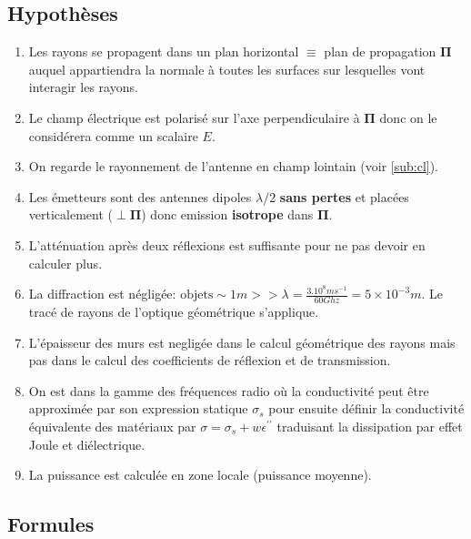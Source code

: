 \documentclass[sn-mathphys-num]{sn-jnl}
\begin{document}
    \subsection{Hypothèses}
    \begin{enumerate}
        \item Les rayons se propagent dans un plan horizontal $\equiv$ plan de propagation $\mathbf{\Pi}$ 
        auquel appartiendra la normale à toutes les surfaces sur lesquelles vont interagir les rayons.
        \item Le champ électrique est polarisé sur l'axe perpendiculaire à $\mathbf{\Pi}$
        donc on le considérera comme un scalaire $E$.
        \item On regarde le rayonnement de l'antenne en champ lointain (voir \ref{sub:cl}).
        \item \label{dipole} Les émetteurs sont des antennes dipoles $\lambda/2$ \textbf{sans pertes}
        et placées verticalement ($\perp \mathbf{\Pi}$) donc emission \textbf{isotrope} dans $\mathbf{\Pi}$.
        \item L'atténuation après deux réflexions est suffisante pour ne pas devoir en calculer plus.
        \item La diffraction est négligée: $\text{objets} \sim 1m >> \lambda = \frac{3.10^8ms^{-1}}{60Ghz} = 5 \times 10^{-3}m$. 
        Le tracé de rayons de l'optique géométrique s'applique.
        \item L'épaisseur des murs est negligée dans le calcul géométrique des rayons mais pas
        dans le calcul des coefficients de réflexion et de transmission.
        \item On est dans la gamme des fréquences radio où la conductivité
        peut être approximée par son expression statique $\sigma_s$
        pour ensuite définir la conductivité équivalente des matériaux par $\sigma = \sigma_s + w\epsilon^{\prime \prime}$
        traduisant la dissipation par effet Joule et diélectrique.
        \item La puissance est calculée en zone locale (puissance moyenne).
    \end{enumerate}

    \subsection{Formules}
\end{document}
